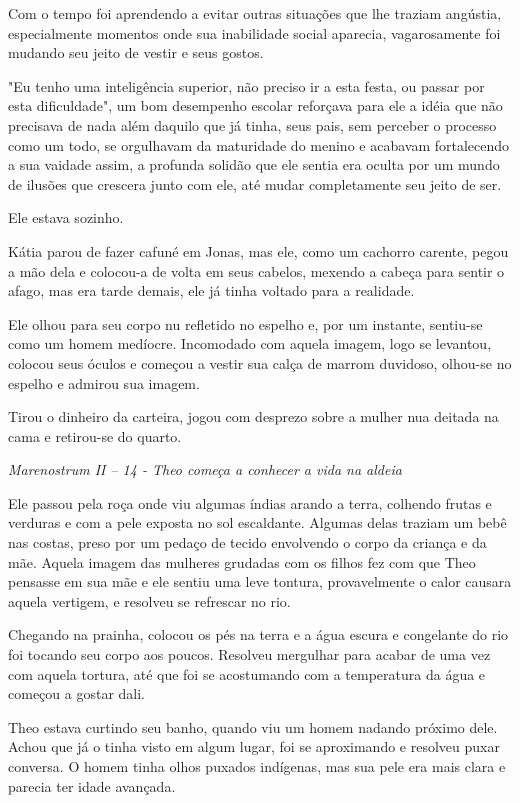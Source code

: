 Com o tempo foi aprendendo a evitar outras situações que lhe traziam
angústia, especialmente momentos onde sua inabilidade social aparecia,
vagarosamente foi mudando seu jeito de vestir e seus gostos.

"Eu tenho uma inteligência superior, não preciso ir a esta festa, ou
passar por esta dificuldade", um bom desempenho escolar reforçava para
ele a idéia que não precisava de nada além daquilo que já tinha, seus
pais, sem perceber o processo como um todo, se orgulhavam da maturidade
do menino e acabavam fortalecendo a sua vaidade assim, a profunda
solidão que ele sentia era oculta por um mundo de ilusões que crescera
junto com ele, até mudar completamente seu jeito de ser.

Ele estava sozinho.

\asterisc

Kátia parou de fazer cafuné em Jonas, mas ele, como um cachorro carente,
pegou a mão dela e colocou-a de volta em seus cabelos, mexendo a cabeça
para sentir o afago, mas era tarde demais, ele já tinha voltado para a
realidade.

Ele olhou para seu corpo nu refletido no espelho e, por um instante,
sentiu-se como um homem medíocre. Incomodado com aquela imagem, logo se
levantou, colocou seus óculos e começou a vestir sua calça de marrom
duvidoso, olhou-se no espelho e admirou sua imagem.

Tirou o dinheiro da carteira, jogou com desprezo sobre a mulher nua
deitada na cama e retirou-se do quarto.

\asterisc

\emph{Marenostrum II -- 14 - Theo começa a conhecer a vida na aldeia}

Ele passou pela roça onde viu algumas índias arando a terra, colhendo
frutas e verduras e com a pele exposta no sol escaldante. Algumas delas
traziam um bebê nas costas, preso por um pedaço de tecido envolvendo o
corpo da criança e da mãe. Aquela imagem das mulheres grudadas com os
filhos fez com que Theo pensasse em sua mãe e ele sentiu uma leve
tontura, provavelmente o calor causara aquela vertigem, e resolveu se
refrescar no rio.

Chegando na prainha, colocou os pés na terra e a água escura e
congelante do rio foi tocando seu corpo aos poucos. Resolveu mergulhar
para acabar de uma vez com aquela tortura, até que foi se acostumando
com a temperatura da água e começou a gostar dali.

Theo estava curtindo seu banho, quando viu um homem nadando próximo
dele. Achou que já o tinha visto em algum lugar, foi se aproximando e
resolveu puxar conversa. O homem tinha olhos puxados indígenas, mas sua
pele era mais clara e parecia ter idade avançada.

